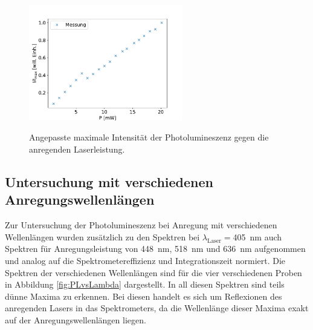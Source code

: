         \FloatBarrier

        \begin{figure}[h]
        \centering
        \includegraphics[width = 0.6\textwidth]{I_P.pdf}
        \label{fig:IvsP}
        \caption{Angepasste maximale Intensität der Photolumineszenz gegen die anregenden Laserleistung.}
        \end{figure}

        \FloatBarrier


\subsection{Untersuchung mit verschiedenen Anregungswellenlängen}
    Zur Untersuchung der Photolumineszenz bei Anregung mit verschiedenen Wellenlängen wurden zusätzlich zu den Spektren bei $\lambda_{\text{Laser}}=$\SI{405}{\nano\metre} auch Spektren für Anregungsleistung
    von \SI{448}{\nano\metre}, \SI{518}{\nano\metre} und \SI{636}{\nano\metre} aufgenommen und analog auf die Spektrometereffizienz und Integrationszeit normiert. Die Spektren der verschiedenen Wellenlängen 
    sind für die vier verschiedenen Proben in Abbildung \ref{fig:PLvsLambda} dargestellt. In all diesen Spektren sind teils dünne Maxima zu erkennen. Bei diesen handelt es sich um Reflexionen des anregenden
    Lasers in das Spektrometers, da die Wellenlänge dieser Maxima exakt auf der Anregungswellenlängen liegen.










\FloatBarrier

